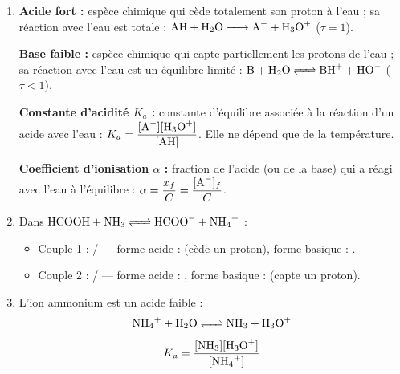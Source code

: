 \documentclass[11pt]{article}
\begin{document}
\begin{corrige}
\begin{enumerate}
\item \textbf{Acide fort :} espèce chimique qui cède totalement son proton à l'eau ; sa réaction avec l'eau est totale : $\ce{AH + H2O -> A- + H3O+}$ ($\tau = 1$).

\textbf{Base faible :} espèce chimique qui capte partiellement les protons de l'eau ; sa réaction avec l'eau est un équilibre limité : $\ce{B + H2O <=> BH+ + HO-}$ ($\tau < 1$).

\textbf{Constante d'acidité $K_a$ :} constante d'équilibre associée à la réaction d'un acide  avec l'eau : $K_a = \dfrac{[\ce{A-}][\ce{H3O+}]}{[\ce{AH}]}$. Elle ne dépend que de la température.

\textbf{Coefficient d'ionisation $\alpha$ :} fraction de l'acide (ou de la base) qui a réagi avec l'eau à l'équilibre : $\alpha = \dfrac{x_f}{C} = \dfrac{[\ce{A-}]_f}{C}$.

\item Dans $\ce{HCOOH + NH3 <=> HCOO- + NH4+}$ :
\begin{itemize}
\item Couple 1 : / — forme acide :  (cède un proton), forme basique : .
\item Couple 2 : / — forme acide : , forme basique :  (capte un proton).
\end{itemize}

\item L'ion ammonium est un acide faible :
\[ \ce{NH4+ + H2O <=> NH3 + H3O+} \]
\[ K_a = \frac{[\ce{NH3}][\ce{H3O+}]}{[\ce{NH4+}]} \]
\end{enumerate}
\end{corrige}
\end{document}
